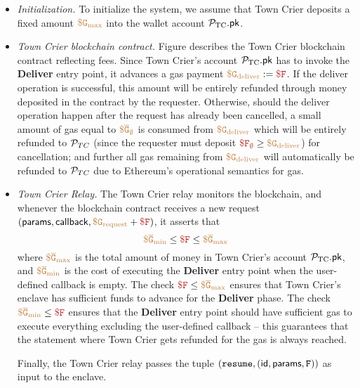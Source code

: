 \begin{itemize}[leftmargin=5mm]
\item
{\it Initialization.}
To initialize the system, we assume that Town Crier 
deposits a fixed amount $\tt {\color{brown} \$ G_{\text{max}} }$ 
into the wallet account ${\mathcal{P}}_{\text{TC}}.{\sf pk}$.
\item
{\it Town Crier blockchain contract.}
Figure  describes the  
Town Crier blockchain contract reflecting fees.
Since Town Crier's account 
${\mathcal{P}}_{\text{TC}}.{\sf pk}$ has to invoke the {\bf Deliver} entry point, it 
advances a gas payment 
$\sbrown{\$ G_{\text{deliver}}} := \smaroon{\$ F}$.
If the deliver operation is successful, 
this amount will be entirely refunded through money deposited in the contract 
by the requester.
Otherwise, should the deliver operation happen after the request has already
been cancelled, 
a small amount of gas equal to $\tt {\color{brown} \$ \overline{G}_\emptyset }$ 
is consumed from $\tt {\color{brown} \$ G_{\text{deliver}} }$
which will be entirely refunded 
to ${\cal P}_{TC}$ (since the requester must deposit $\smaroon{\$ F_{\emptyset}} \geq \sbrown{\$ G_{\text{deliver}}}$) for cancellation;
and further all gas remaining  
from $\tt {\color{brown} \$ G_{\text{deliver}} }$ will automatically 
be refunded to ${\cal P}_{TC}$ due to Ethereum's operational semantics for gas. 
\item
{\it Town Crier Relay.}
The Town Crier relay monitors
the blockchain, and whenever
the blockchain contract \tcont
receives a new request $({\sf params}, {\sf callback}, 
\sbrown{\$ G_{\text{request}}}+\smaroon{\$ F})$,
it asserts that 
\[
\sbrown{\$ \overline{G}_{\text{min}}}
\leq \smaroon{\$ F} \leq \sbrown{\$ \overline{G}_{\text{max}}}
\]
where $\tt {\color{brown} \$ \overline{G}_{\text{max}} }$ is the total amount of money
in Town Crier's account ${\mathcal{P}}_{\text{TC}}.{\sf pk}$, 
and $\tt {\color{brown} \$ \overline{G}_{\text{min}} }$
is the cost of executing the {\bf Deliver} entry point 
when the user-defined callback is empty.
The check 
$\smaroon{\$ F} \leq \sbrown{\$ \overline{G}_{\text{max}}}$
ensures that Town Crier's enclave  
has sufficient funds to advance
for the {\bf Deliver} phase.
The check 
$\sbrown{\$ \overline{G}_{\text{min}}}
\leq \smaroon{\$ F}$
ensures that 
the {\bf Deliver} entry point should 
have sufficient gas to execute everything excluding the user-defined
callback -- this guarantees that the statement
where Town Crier gets refunded for the gas is always reached.


Finally, the Town Crier relay passes
the tuple $({\tt resume}, 
({\sf id}, {\sf params}, 
{\tt F}
))$
as input to the enclave.



\end{itemize}
